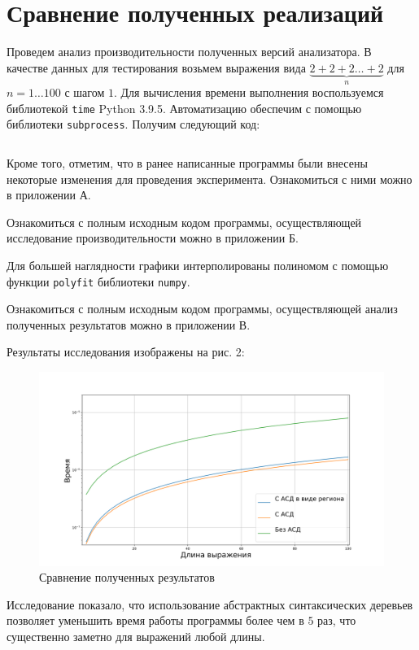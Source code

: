 \documentclass[bachelor, och, otchet]{SCWorks}
\begin{document}
\section{Сравнение полученных реализаций}
Проведем анализ производительности полученных версий анализатора. В качестве
данных для тестирования возьмем выражения вида $\underbrace{2 + 2 + 2 \dots +
2}_{n}$ для $n = 1\dots100$ с шагом $1$. Для вычисления времени выполнения
воспользуемся библиотекой \verb|time| Python 3.9.5. Автоматизацию обеспечим с
помощью библиотеки \verb|subprocess|. Получим следующий код:

\inputminted{python}{test.py}

Кроме того, отметим, что в ранее написанные программы были внесены некоторые
изменения для проведения эксперимента. Ознакомиться с ними можно в приложении А.

Ознакомиться с полным исходным кодом программы, осуществляющей исследование
производительности можно в приложении Б.

Для большей наглядности графики интерполированы полиномом с помощью функции
\verb|polyfit| библиотеки \verb|numpy|.

Ознакомиться с полным исходным кодом программы, осуществляющей анализ полученных
результатов можно в приложении В.

Результаты исследования изображены на рис. 2:

\begin{figure}[hbt!]
    \centering
    \includegraphics[scale=0.5]{benchmark.png}
    \caption{Сравнение полученных результатов}
    \label{fig:benchmark}
\end{figure}

Исследование показало, что использование абстрактных синтаксических деревьев
позволяет уменьшить время работы программы более чем в $5$ раз, что существенно
заметно для выражений любой длины.
\end{document}

